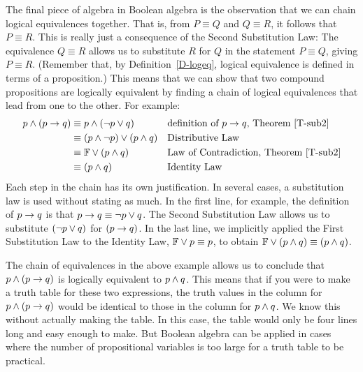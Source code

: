 The final piece of algebra in Boolean algebra is the observation
that we can chain logical equivalences together.  That is,
from $P\equiv Q$ and $Q\equiv R$, it follows that $P\equiv R$.
This is really just a consequence of the Second Substitution
Law: The equivalence $Q\equiv R$ allows us to substitute $R$ for $Q$ in
the statement $P\equiv Q$, giving $P\equiv R$.
(Remember that, by Definition~\ref{D-logeq}, logical equivalence is defined in 
terms of a proposition.)
This means that we can show that two compound propositions are
logically equivalent by finding a chain of logical equivalences that
lead from one to the other.  For example:
\begin{align*}
 p\wedge(p\rightarrow q) &\equiv p\wedge(\lnot p\vee q)          &&\text{definition of $p\rightarrow q$, Theorem \ref{T-sub2}}\\
                &\equiv (p\wedge \lnot p)\vee (p\wedge q) &&\text{Distributive Law}\\ 
                &\equiv \mathbb{F}\vee(p\wedge q)              &&\text{Law of Contradiction, Theorem \ref{T-sub2}}\\
                &\equiv (p\wedge q)                   &&\text{Identity Law}\\
\end{align*}
Each step in the chain has its own justification.  In several cases,
a substitution law is used without stating as much.  In the first line,
for example, the definition of $p\rightarrow q$ is that $p\rightarrow q\equiv \lnot p\vee q$.
The Second Substitution Law allows us to substitute $(\lnot p\vee q)$ for
$(p\rightarrow q)$.  In the last line, we implicitly applied the First
Substitution Law to the Identity Law, $\mathbb{F}\vee p\equiv p$, to obtain
$\mathbb{F}\vee(p\wedge q)\equiv (p\wedge q)$.  

The chain of equivalences in the above example allows us to conclude
that $p\wedge(p\rightarrow q)$ is logically equivalent to $p\wedge q$.
This means that if you were to make a truth table for these two
expressions, the truth values in the column for $p\wedge(p\rightarrow q)$
would be identical to those in the column for $p\wedge q$.  We know
this without actually making the table.  In this case, the table
would only be four lines long and easy enough to make.  But Boolean
algebra can be applied in cases where the number of propositional
variables is too large for a truth table to be practical. 

